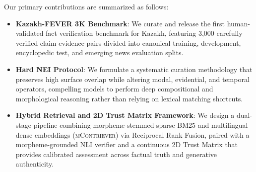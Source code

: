 Our primary contributions are summarized as follows:
\begin{itemize}
    \item \textbf{Kazakh-FEVER 3K Benchmark}: We curate and release the first human-validated fact verification benchmark for Kazakh, featuring 3,000 carefully verified claim-evidence pairs divided into canonical training, development, encyclopedic test, and emerging news evaluation splits.
    \item \textbf{Hard NEI Protocol}: We formulate a systematic curation methodology that preserves high surface overlap while altering modal, evidential, and temporal operators, compelling models to perform deep compositional and morphological reasoning rather than relying on lexical matching shortcuts.
    \item \textbf{Hybrid Retrieval and 2D Trust Matrix Framework}: We design a dual-stage pipeline combining morpheme-stemmed sparse BM25 and multilingual dense embeddings (\textsc{mContriever}) via Reciprocal Rank Fusion, paired with a morpheme-grounded NLI verifier and a continuous 2D Trust Matrix that provides calibrated assessment across factual truth and generative authenticity.
\end{itemize}
